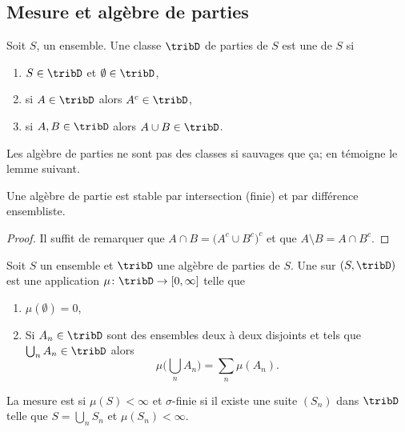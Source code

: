 \subsection{Mesure et algèbre de parties}

\begin{definition}   \label{DefTCUoogGDud}
    Soit \( S\), un ensemble. Une classe \( \tribD\) de parties de \( S\) est une  de \( S\) si
    \begin{enumerate}
        \item
            \( S\in\tribD\) et \( \emptyset\in\tribD\),
        \item
            si \( A\in\tribD\) alors \( A^c\in\tribD\),
        \item
            si \( A,B\in\tribD\) alors \( A\cup B\in\tribD\).
    \end{enumerate}
\end{definition}

Les algèbre de parties ne sont pas des classes si sauvages que ça; en témoigne le lemme suivant.
\begin{lemma}   \label{LemBFKootqXKl}
    Une algèbre de partie est stable par intersection (finie) et par différence ensembliste.
\end{lemma}

\begin{proof}
    Il suffit de remarquer que \( A\cap B=\big( A^c\cup B^c \big)^c\) et que \( A\setminus B=A\cap B^c\).
\end{proof}

\begin{definition}       \label{DefWUPHooEklLmR}
    Soit \( S\) un ensemble et \( \tribD\) une algèbre de parties de \( S\). Une  sur \( (S,\tribD)\) est une application \( \mu\colon \tribD\to \mathopen[ 0 , \infty \mathclose]\) telle que
    \begin{enumerate}
        \item
            \( \mu(\emptyset)=0\),
        \item
            Si \( A_n\in\tribD\) sont des ensembles deux à deux disjoints et tels que \( \bigcup_nA_n\in\tribD\) alors
            \begin{equation}
                \mu\big( \bigcup_nA_n \big)=\sum_n\mu(A_n).
            \end{equation}
    \end{enumerate}

    La mesure est  si \( \mu(S)<\infty\) et \( \sigma\)-finie si il existe une suite \( (S_n)\) dans \( \tribD\) telle que \( S=\bigcup_nS_n\) et \( \mu(S_n)<\infty\).
\end{definition}

